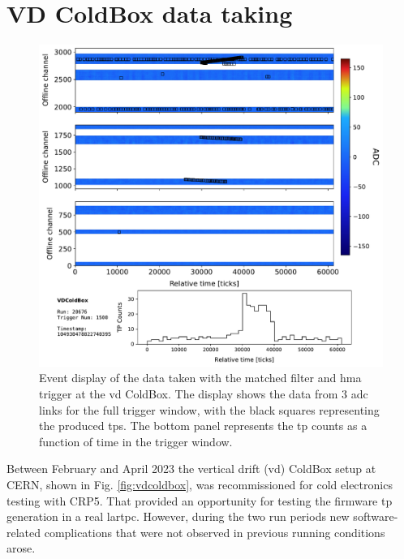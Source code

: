 \section{VD ColdBox data taking}
\label{sec:matched_filter_vdcoldbox}

\begin{figure}[t]
    \centering
    \includegraphics[scale = 0.5]{Images/Matched_Filter/TRDisplay_np02_coldbox_run020676_0001.pdf}
    \caption[Event display of the data taken with the matched filter and \gls{hma} trigger at the \gls{vd} ColdBox.]{Event display of the data taken with the matched filter and \gls{hma} trigger at the \gls{vd} ColdBox. The display shows the data from 3 \gls{adc} links for the full trigger window, with the black squares representing the produced \gls{tp}s. The bottom panel represents the \gls{tp} counts as a function of time in the trigger window.}
    \label{fig:example_hma_evd}
\end{figure}

Between February and April 2023 the vertical drift (\gls{vd}) ColdBox setup at CERN, shown in Fig. \ref{fig:vdcoldbox}, was recommissioned for cold electronics testing with CRP5. That provided an opportunity for testing the firmware \gls{tp} generation in a real \gls{lartpc}. However, during the two run periods new software-related complications that were not observed in previous running conditions arose.


